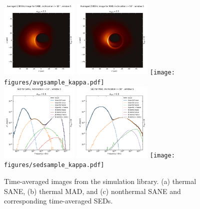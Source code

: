
\begin{figure}
  \centering
  \includegraphics[width=0.333\textwidth]{figures/avgsample_SANE.pdf}%
  \includegraphics[width=0.333\textwidth]{figures/avgsample_MAD.pdf}%
  \texttt{[image: figures/avgsample\_kappa.pdf]}\\
    \includegraphics[width=0.333\textwidth]{figures/sedsample_SANE.pdf}%
  \includegraphics[width=0.333\textwidth]{figures/sedsample_MAD.pdf}%
  \texttt{[image: figures/sedsample\_kappa.pdf]}
  \caption{Time-averaged images from the simulation library.
    (a) thermal SANE, (b) thermal MAD, and (c) nonthermal SANE and corresponding time-averaged SEDs.}
  \label{fig:fiducial_imgs}
\end{figure}

